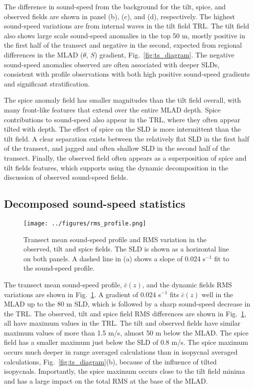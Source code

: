 \documentclass[preprint,NumberedRefs]{JASA}
\begin{document}
The difference in sound-speed from the background for the tilt, spice, and observed fields are shown in panel (b), (c), and (d), respectively. The highest sound-speed variations are from internal waves in the tilt field TRL. The tilt field also shows large scale sound-speed anomalies in the top 50 m, mostly positive in the first half of the transect and negative in the second, expected from regional differences in the MLAD ($\theta$, $S$) gradient, Fig.~\ref{fig:ts_diagram}. The negative sound-speed anomalies observed are often associated with deeper SLDs, consistent with profile observations with both high positive sound-speed gradients and significant stratification.\cite{colosi2020observations}

The spice anomaly field has smaller magnitudes than the tilt field overall, with many front-like features that extend over the entire MLAD depth. Spice contributions to sound-speed also appear in the TRL, where they often appear tilted with depth. The effect of spice on the SLD is more intermittent than the tilt field. A clear separation exists between the relatively flat SLD in the first half of the transect, and jagged and often shallow SLD in the second half of the transect. Finally, the observed field often appears as a superposition of spice and tilt fields features, which supports using the dynamic decomposition in the discussion of observed sound-speed fields.

\subsection{Decomposed sound-speed statistics}\label{ssec:decomp}
\begin{figure}
\texttt{[image: ../figures/rms\_profile.png]}
        \caption{\label{fig:c_rms}{Transect mean sound-speed profile and RMS variation in the observed, tilt and spice fields. The SLD is shown as a horizontal line on both panels. A dashed line in (a) shows a slope of 0.024 s$^{-1}$ fit to the sound-speed profile.}}
\end{figure}

The transect mean sound-speed profile, $\bar{c}(z)$, and the dynamic fields RMS variations are shown in Fig.~\ref{fig:c_rms}. A gradient of 0.024 s$^{-1}$ fits $\bar{c}(z)$ well in the MLAD up to the 80 m SLD, which is followed by a sharp sound-speed decrease in the TRL. The observed, tilt and spice field RMS differences are shown in Fig.~\ref{fig:c_rms}, all have maximum values in the TRL. The tilt and observed fields have similar maximum values of more than 1.5 m/s, almost 50 m below the MLAD. The spice field has a smaller maximum just below the SLD of 0.8 m/s. The spice maximum occurs much deeper in range averaged calculations than in isopycnal averaged calculations, Fig.~\ref{fig:ts_diagram}(b), because of the influence of tilted isopycnals.\citep{ferrari2000} Importantly, the spice maximum occurs close to the tilt field minima and has a large impact on the total RMS at the base of the MLAD.
\end{document}

